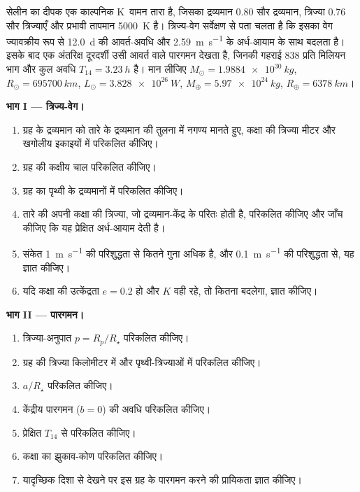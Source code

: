 \begin{problem}
\label{pb:b3:exoplanets:1}
सेलीन का दीपक एक काल्पनिक K~वामन तारा है, जिसका द्रव्यमान 0.80 सौर द्रव्यमान,
त्रिज्या 0.76 सौर त्रिज्याएँ और प्रभावी तापमान \qty{5000}{K} है।
त्रिज्य-वेग सर्वेक्षण से पता चलता है कि इसका वेग ज्यावक्रीय रूप से
\qty{12.0}{d} की आवर्त-अवधि और \qty{2.59}{m.s^{-1}} के अर्ध-आयाम के साथ बदलता है। इसके बाद एक
अंतरिक्ष दूरदर्शी उसी आवर्त वाले पारगमन देखता है, जिनकी गहराई
\num{838} प्रति मिलियन भाग और कुल अवधि $T_{14} = \qty{3.23}{h}$ है।
मान लीजिए $M_\odot = \qty{1.9884e30}{kg}$, $R_\odot = \qty{695700}{km}$,
$L_\odot = \qty{3.828e26}{W}$, $M_\oplus = \qty{5.97e24}{kg}$,
$R_\oplus = \qty{6378}{km}$।

\medskip\noindent\textbf{भाग I --- त्रिज्य-वेग।}
\begin{enumerate}
\item ग्रह के द्रव्यमान को तारे के द्रव्यमान की तुलना में नगण्य मानते हुए,
  कक्षा की त्रिज्या मीटर और खगोलीय इकाइयों में परिकलित कीजिए।
\item ग्रह की कक्षीय चाल परिकलित कीजिए।
\item ग्रह का  पृथ्वी के द्रव्यमानों में परिकलित कीजिए।
\item तारे की अपनी कक्षा की त्रिज्या, जो द्रव्यमान-केंद्र के परितः होती है,
  परिकलित कीजिए और जाँच कीजिए कि यह प्रेक्षित अर्ध-आयाम देती है।
\item संकेत \qty{1}{m.s^{-1}} की परिशुद्धता से कितने गुना अधिक है,
  और \qty{0.1}{m.s^{-1}} की परिशुद्धता से, यह ज्ञात कीजिए।
\item यदि कक्षा की उत्केंद्रता $e = 0.2$ हो और $K$ वही रहे, तो 
  कितना बदलेगा, ज्ञात कीजिए।
\end{enumerate}

\medskip\noindent\textbf{भाग II --- पारगमन।}
\begin{enumerate}[resume]
\item त्रिज्या-अनुपात $p = R_p/R_\star$ परिकलित कीजिए।
\item ग्रह की त्रिज्या किलोमीटर में और पृथ्वी-त्रिज्याओं में परिकलित कीजिए।
\item $a/R_\star$ परिकलित कीजिए।
\item केंद्रीय पारगमन ($b = 0$) की अवधि परिकलित कीजिए।
\item प्रेक्षित $T_{14}$ से  परिकलित कीजिए।
\item कक्षा का झुकाव-कोण परिकलित कीजिए।
\item यादृच्छिक दिशा से देखने पर इस ग्रह के पारगमन करने की
  प्रायिकता ज्ञात कीजिए।
\end{enumerate}


\end{problem}
